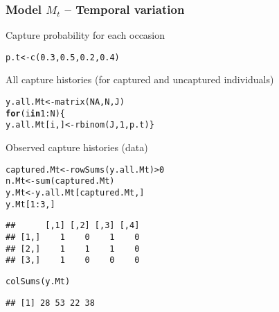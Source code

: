 \documentclass[color=usenames,dvipsnames]{beamer}\usepackage[]{graphicx}\usepackage[]{color}
\makeatletter
\newcommand{\hlnum}[1]{\textcolor[rgb]{0.69,0.494,0}{#1}}%
\newcommand{\hlopt}[1]{\textcolor[rgb]{0,0,0}{#1}}%
\newcommand{\hlstd}[1]{\textcolor[rgb]{0,0,0}{#1}}%
\newcommand{\hlkwa}[1]{\textcolor[rgb]{0,0,0}{\textbf{#1}}}%
\newcommand{\hlkwb}[1]{\textcolor[rgb]{0,0.341,0.682}{#1}}%
\newcommand{\hlkwd}[1]{\textcolor[rgb]{0.004,0.004,0.506}{#1}}%
\newenvironment{kframe}{%
 \def\at@end@of@kframe{}%
 \ifinner\ifhmode%
  \def\at@end@of@kframe{\end{minipage}}%
  \begin{minipage}{\columnwidth}%
 \fi\fi%
 \def\FrameCommand##1{\hskip\@totalleftmargin \hskip-\fboxsep
 \colorbox{shadecolor}{##1}\hskip-\fboxsep
     \hskip-\linewidth \hskip-\@totalleftmargin \hskip\columnwidth}%
 \MakeFramed {\advance\hsize-\width
   \@totalleftmargin\z@ \linewidth\hsize
   \@setminipage}}%
 {\par\unskip\endMakeFramed%
 \at@end@of@kframe}
\newenvironment{knitrout}{}{} %
\makeatother
\begin{document}
\begin{frame}[fragile]
  \frametitle{Model $M_t$ -- Temporal variation}
  Capture probability for each occasion
\begin{knitrout}\scriptsize
{}\color{fgcolor}\begin{kframe}
\begin{alltt}
\hlstd{p.t} \hlkwb{<-} \hlkwd{c}\hlstd{(}\hlnum{0.3}\hlstd{,} \hlnum{0.5}\hlstd{,} \hlnum{0.2}\hlstd{,} \hlnum{0.4}\hlstd{)}
\end{alltt}
\end{kframe}
\end{knitrout}
  \pause
  \vfill
  All capture histories (for captured and uncaptured individuals)
  \vspace{-6pt}
\begin{knitrout}\scriptsize
{}\color{fgcolor}\begin{kframe}
\begin{alltt}
\hlstd{y.all.Mt} \hlkwb{<-} \hlkwd{matrix}\hlstd{(}\hlnum{NA}\hlstd{, N, J)}
\hlkwa{for}\hlstd{(i} \hlkwa{in} \hlnum{1}\hlopt{:}\hlstd{N) \{}
    \hlstd{y.all.Mt[i,]} \hlkwb{<-} \hlkwd{rbinom}\hlstd{(J,} \hlnum{1}\hlstd{, p.t) \}}
\end{alltt}
\end{kframe}
\end{knitrout}
  \pause
  \vfill
  Observed capture histories (data)
  \vspace{-6pt}
\begin{knitrout}\scriptsize
{}\color{fgcolor}\begin{kframe}
\begin{alltt}
\hlstd{captured.Mt} \hlkwb{<-} \hlkwd{rowSums}\hlstd{(y.all.Mt)}\hlopt{>}\hlnum{0}
\hlstd{n.Mt} \hlkwb{<-} \hlkwd{sum}\hlstd{(captured.Mt)}
\hlstd{y.Mt} \hlkwb{<-} \hlstd{y.all.Mt[captured.Mt,]}
\hlstd{y.Mt[}\hlnum{1}\hlopt{:}\hlnum{3}\hlstd{,]}
\end{alltt}
\begin{verbatim}
##      [,1] [,2] [,3] [,4]
## [1,]    1    0    1    0
## [2,]    1    1    1    0
## [3,]    1    0    0    0
\end{verbatim}
\begin{alltt}
\hlkwd{colSums}\hlstd{(y.Mt)}
\end{alltt}
\begin{verbatim}
## [1] 28 53 22 38
\end{verbatim}
\end{kframe}
\end{knitrout}
\end{frame}
\end{document}
